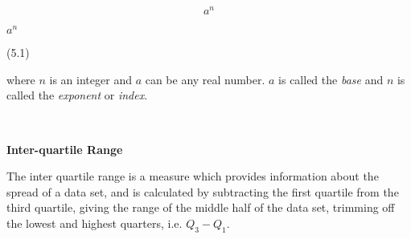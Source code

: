 \begin{description}
\begin{description}
{\begin{equation}
    {a}^{n}\tag{5.1}
      \end{equation}
    }{%
    \setlength{\mymathboxwidth}{\columnwidth}
      \addtolength{\mymathboxwidth}{-48pt}
    \par\vspace{12pt}\noindent\begin{minipage}{\columnwidth}
    \parbox[t]{\mymathboxwidth}{\large\begin{math}
    {a}^{n}\end{math}}\hfill
    \parbox[t]{48pt}{\raggedleft 
    (5.1)}
    \end{minipage}\vspace{12pt}\par
    }%
      \label{m38359*id62692}where \begin{math}n\end{math} is an integer and \begin{math}a\end{math} can be any real number. \begin{math}a\end{math} is called the \textsl{base} and \begin{math}n\end{math} is called the \textsl{exponent} or \textsl{index}. \par 
      \\\end{description}
	    \vspace{.3cm}
	    \item[{\large \bfseries I}]\noindent\raggedright
	    {\bf  Inter-quartile Range }\\\begin{description}\item{\hspace{.3cm}}\hspace{.3cm}
          \label{m39400*id214019}The inter quartile range is a measure which provides information about the spread of a data set, and is calculated by subtracting the first quartile from the third quartile, giving the range of the middle half of the data set, trimming off the lowest and highest quarters, i.e. \begin{math}{Q}_{3}-{Q}_{1}\end{math}. \par 
          \\\end{description}

\end{description}
